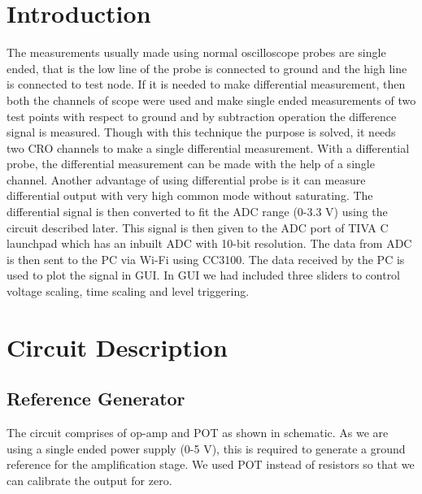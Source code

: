 \documentclass{article}
\begin{document}
	\section{Introduction}
	The measurements usually made using normal oscilloscope probes are single
	ended, that is the low line of the probe is connected to ground and the high line is
	connected to test node. If it is needed to make differential measurement, then both
	the channels of scope were used and make single ended measurements of two test
	points with respect to ground and by subtraction operation the difference signal is
	measured. Though with this technique the purpose is solved, it needs two CRO
	channels to make a single differential measurement. With a differential probe, the
	differential measurement can be made with the help of a single channel. Another
	advantage of using differential probe is it can measure differential output with very
	high common mode without saturating.
	The differential signal is then converted to fit the ADC range (0-3.3 V) using the
	circuit described later. This signal is then given to the ADC port of TIVA C launchpad
	which has an inbuilt ADC with 10-bit resolution. The data from ADC is then sent to
	the PC via Wi-Fi using CC3100. The data received by the PC is used to plot the
	signal in GUI. In GUI we had included three sliders to control voltage scaling, time
	scaling and level triggering.
	
	\section{Circuit Description}
	\subsection{Reference Generator}
	The circuit comprises of op-amp and POT as shown in schematic. As we are
	using a single ended power supply (0-5 V), this is required to generate a ground
	reference for the amplification stage.
	We used POT instead of resistors so that we can calibrate the output for zero.
\end{document}
